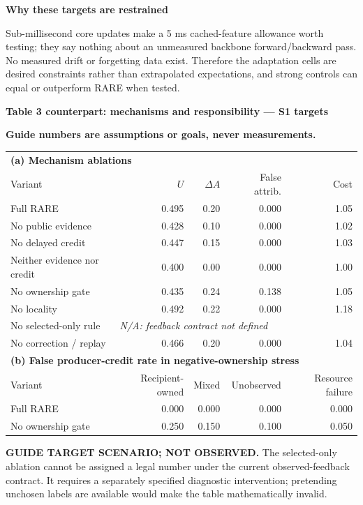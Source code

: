 \documentclass[10pt,a4paper]{article}
\newcommand{\status}{\textcolor{red!70!black}{\textbf{Guide numbers are assumptions or goals, never measurements.}}\par}
\newcommand{\lead}[1]{\vspace{4pt}\textbf{#1}\par}
\begin{document}
\lead{Why these targets are restrained}
Sub-millisecond core updates make a 5 ms cached-feature allowance worth testing;
they say nothing about an unmeasured backbone forward/backward pass. No measured
drift or forgetting data exist. Therefore the adaptation cells are desired
constraints rather than extrapolated expectations, and strong controls can
equal or outperform RARE when tested.

\clearpage
\lead{Table 3 counterpart: mechanisms and responsibility --- S1 targets}
\status
\begin{center}\small
\begin{tabular*}{\linewidth}{@{\extracolsep{\fill}}lrrrr@{}}\toprule
\multicolumn{5}{l}{\textbf{(a) Mechanism ablations}}\\
Variant & $U$ & $\Delta A$ & False attrib. & Cost\\\midrule
Full RARE & 0.495 & 0.20 & 0.000 & 1.05\\
No public evidence & 0.428 & 0.10 & 0.000 & 1.02\\
No delayed credit & 0.447 & 0.15 & 0.000 & 1.03\\
Neither evidence nor credit & 0.400 & 0.00 & 0.000 & 1.00\\
No ownership gate & 0.435 & 0.24 & 0.138 & 1.05\\
No locality & 0.492 & 0.22 & 0.000 & 1.18\\
No selected-only rule & \multicolumn{4}{l}{\textit{N/A: feedback contract not defined}}\\
No correction / replay & 0.466 & 0.20 & 0.000 & 1.04\\
\midrule
\multicolumn{5}{l}{\textbf{(b) False producer-credit rate in negative-ownership stress}}\\
Variant & Recipient-owned & Mixed & Unobserved & Resource failure\\\midrule
Full RARE & 0.000 & 0.000 & 0.000 & 0.000\\
No ownership gate & 0.250 & 0.150 & 0.100 & 0.050\\
\bottomrule\end{tabular*}\end{center}
\textbf{GUIDE TARGET SCENARIO; NOT OBSERVED.} The selected-only ablation cannot
be assigned a legal number under the current observed-feedback contract. It
requires a separately specified diagnostic intervention; pretending unchosen
labels are available would make the table mathematically invalid.
\end{document}
